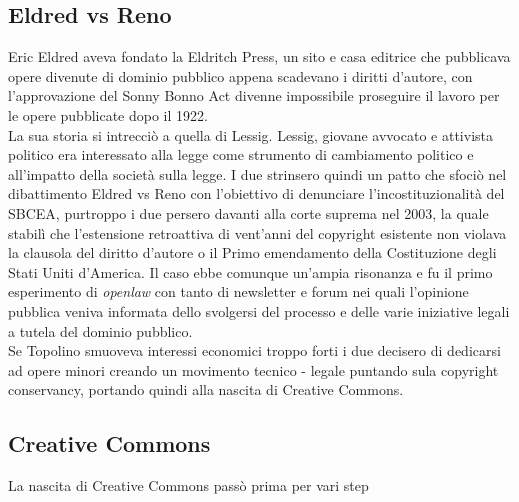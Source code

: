 \subsection{Eldred vs Reno}

Eric Eldred aveva fondato la Eldritch Press, un sito e casa editrice che pubblicava opere divenute di dominio pubblico appena scadevano i diritti d'autore, con l'approvazione del Sonny Bonno Act divenne impossibile proseguire il lavoro per le opere pubblicate dopo il 1922. \\

La sua storia si intrecciò a quella di Lessig. Lessig, giovane avvocato e attivista politico era interessato alla legge come strumento di cambiamento politico e all'impatto della società sulla legge. I due strinsero quindi un patto che sfociò nel dibattimento Eldred vs Reno con l'obiettivo di denunciare l'incostituzionalità del SBCEA, purtroppo i due persero davanti alla corte suprema nel 2003, la quale stabilì che l'estensione retroattiva di vent'anni del copyright esistente non violava la clausola del diritto d'autore o il Primo emendamento della Costituzione degli Stati Uniti d'America.  Il caso ebbe comunque un'ampia risonanza e fu il primo esperimento di \textit{openlaw} con tanto di newsletter e forum nei quali l'opinione pubblica veniva informata dello svolgersi del processo e delle varie iniziative legali a tutela del dominio pubblico.\\

Se Topolino smuoveva interessi economici troppo forti i due decisero di dedicarsi ad opere minori creando un movimento tecnico - legale puntando sula copyright conservancy, portando quindi alla nascita di Creative Commons.

\subsection{Creative Commons}
La nascita di Creative Commons passò prima per vari step

